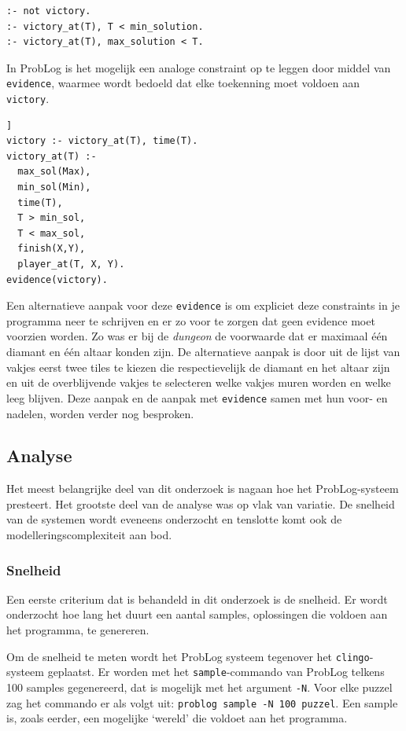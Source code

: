 \documentclass{article}
\begin{document}
\begin{lstlisting}[language=Prolog-pretty]
:- not victory.
:- victory_at(T), T < min_solution.
:- victory_at(T), max_solution < T.
\end{lstlisting}

In ProbLog is het mogelijk een analoge constraint op te leggen door middel van \texttt{evidence}, waarmee wordt bedoeld dat elke toekenning moet voldoen aan \texttt{victory}.
\begin{lstlisting}[language=Prolog-pretty,xleftmargin=0\textwidth,xrightmargin=.0\textwidth]]
victory :- victory_at(T), time(T).
victory_at(T) :-
  max_sol(Max),
  min_sol(Min),
  time(T),
  T > min_sol,
  T < max_sol,
  finish(X,Y),
  player_at(T, X, Y).
evidence(victory).
\end{lstlisting}

Een alternatieve aanpak voor deze \texttt{evidence} is om expliciet deze constraints in je programma neer te schrijven en er zo voor te zorgen dat geen evidence moet voorzien worden. Zo was er bij de \textit{dungeon} de voorwaarde dat er maximaal \'e\'en diamant en \'e\'en altaar konden zijn. De alternatieve aanpak is door uit de lijst van vakjes eerst twee tiles te kiezen die respectievelijk de diamant en het altaar zijn en uit de overblijvende vakjes te selecteren welke vakjes muren worden en welke leeg blijven. Deze aanpak en de aanpak met \texttt{evidence} samen met hun voor- en nadelen, worden verder nog besproken.
	
	\subsection{Analyse}
Het meest belangrijke deel van dit onderzoek is nagaan hoe het ProbLog-systeem presteert. Het grootste deel van de analyse was op vlak van variatie. De snelheid van de systemen wordt eveneens onderzocht en tenslotte komt ook de modelleringscomplexiteit aan bod.

\subsubsection{Snelheid}
Een eerste criterium dat is behandeld in dit onderzoek is de snelheid. Er wordt onderzocht hoe lang het duurt een aantal samples, oplossingen die voldoen aan het programma, te genereren. 

Om de snelheid te meten wordt het ProbLog systeem tegenover het \texttt{clingo}-systeem geplaatst. Er worden met het \texttt{sample}-commando van ProbLog telkens 100 samples gegenereerd, dat is mogelijk met het argument \texttt{-N}. Voor elke puzzel zag het commando er als volgt uit: \texttt{problog sample -N 100 puzzel}. Een sample is, zoals eerder, een mogelijke `wereld' die voldoet aan het programma.
\end{document}
